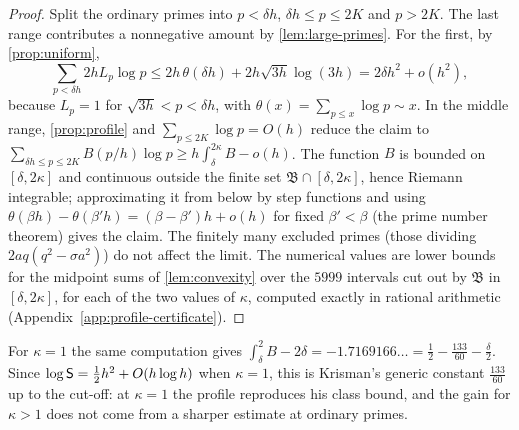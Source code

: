 \begin{proof}
Split the ordinary primes into $p<\delta h$, $\delta h\le p\le2K$ and $p>2K$. The last range
contributes a nonnegative amount by \cref{lem:large-primes}. For the first, by
\cref{prop:uniform},
\[
  \sum_{p<\delta h}2hL_p\log p\le2h\,\theta(\delta h)+2h\sqrt{3h}\log(3h)=2\delta h^2+o(h^2),
\]
because $L_p=1$ for $\sqrt{3h}<p<\delta h$, with $\theta(x)=\sum_{p\le x}\log p\sim x$. In the middle
range, \cref{prop:profile} and $\sum_{p\le2K}\log p=O(h)$ reduce the claim to
$\sum_{\delta h\le p\le2K}B(p/h)\log p\ge h\int_\delta^{2\kappa}B-o(h)$. The function $B$ is bounded
on $[\delta,2\kappa]$ and continuous outside the finite set $\mathfrak B\cap[\delta,2\kappa]$,
hence Riemann integrable; approximating it from below by step functions and using
$\theta(\beta h)-\theta(\beta'h)=(\beta-\beta')h+o(h)$ for fixed $\beta'<\beta$ (the prime number
theorem) gives the claim. The finitely many excluded primes (those dividing $2aq(q^2-\sigma a^2)$)
do not affect the limit. The numerical values are lower bounds for the midpoint sums of
\cref{lem:convexity} over the $5999$ intervals cut out by $\mathfrak B$ in $[\delta,2\kappa]$,
for each of the two values of $\kappa$, computed exactly in rational arithmetic
(Appendix~\ref{app:profile-certificate}).
\end{proof}

\begin{remark}\label{rem:profile-k1}
For $\kappa=1$ the same computation gives $\int_\delta^2B-2\delta=-1.7169166\ldots
=\frac12-\frac{133}{60}-\frac\delta2$. Since $\log\mathsf{S}=\frac12h^2+O(h\log h)$ when $\kappa=1$,
this is Krisman's generic constant $\frac{133}{60}$ \cite[Thm.~4.5]{Krisman2026chi2} up to the
cut-off: at $\kappa=1$ the profile reproduces his class bound, and the gain for $\kappa>1$ does
not come from a sharper estimate at ordinary primes.
\end{remark}

